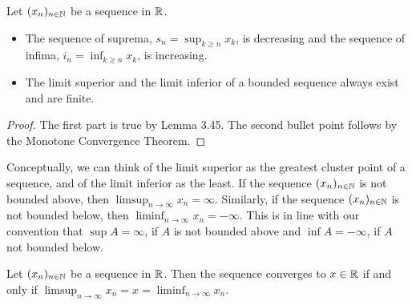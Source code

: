 \documentclass{article}
\begin{document}
\begin{proposition}\label{prop:limsup_monotonicity}
Let $(x_n)_{n \in {\mathbb{N}}}$ be a sequence in ${\mathbb{R}}$.
\begin{itemize} 
\item The sequence of suprema, $s_n = \sup_{k\geq n} x_k$, is decreasing and the sequence of infima, $i_n = \inf_{k\geq n} x_k$, is increasing.
\item The limit superior and the limit inferior of a bounded sequence always exist and are finite.
\end{itemize}
\end{proposition}
\begin{proof}
The first part is true by Lemma 3.45. The second bullet point follows by the Monotone Convergence Theorem.
\end{proof}

Conceptually, we can think of the limit superior as the greatest cluster point of a sequence, and of the limit inferior as the least.
If the sequence $(x_n)_{n\in {\mathbb{N}}}$ is not bounded above, then $\limsup_{n\to \infty} x_n = \infty$. Similarly, if the sequence $(x_n)_{n\in {\mathbb{N}}}$ is not bounded below, then $\liminf_{n\to \infty} x_n = -\infty$. This is in line with our convention that $\sup A = \infty$, if $A$ is not bounded above and $\inf A = -\infty$, if $A$ not bounded below. 

\begin{theorem}
Let $(x_n)_{n\in {\mathbb{N}}}$ be a sequence in ${\mathbb{R}}$. Then the sequence converges to $x\in {\mathbb{R}}$ if and only if $\limsup_{n\to \infty} x_n= x =\liminf_{n\to \infty} x_n$.
\end{theorem}
\end{document}
